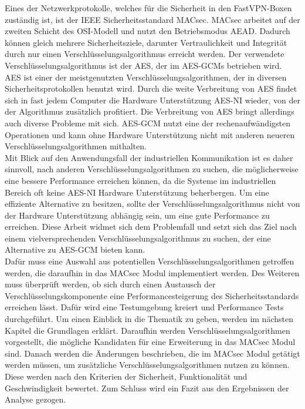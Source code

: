 Eines der Netzwerkprotokolle, welches für die Sicherheit in den FastVPN-Boxen zuständig ist, ist der \gls{IEEE} Sicherheitsstandard \gls{MACsec}. \gls{MACsec} arbeitet auf der zweiten Schicht des \gls{OSI-Modell} und nutzt den  Betriebsmodus \gls{AEAD}. Dadurch können gleich mehrere Sicherheitsziele, darunter Vertraulichkeit und Integrität durch nur einen Verschlüsselungsalgorithmus erreicht werden. Der verwendete Verschlüsselungsalgorithmus ist der \gls{AES}, der im  \glspl{AES-GCM} betrieben wird. \gls{AES} ist einer der meistgenutzten Verschlüsselungsalgorithmen, der in diversen Sicherheitsprotokollen benutzt wird. Durch die weite Verbreitung von \gls{AES} findet sich in fast jedem Computer die Hardware Unterstützung \gls{AES-NI} wieder, von der der Algorithmus zusätzlich profitiert. Die Verbreitung von \gls{AES} bringt allerdings auch diverse Probleme mit sich. \gls{AES-GCM} nutzt eine der rechenaufwändigsten Operationen und kann ohne Hardware Unterstützung nicht mit anderen neueren Verschlüsselungsalgorithmen mithalten.\\  
Mit Blick auf den Anwendungsfall der industriellen Kommunikation ist es daher sinnvoll, nach anderen Verschlüsselungsalgorithmen zu suchen, die möglicherweise eine bessere Performance erreichen können, da die Systeme im industriellen Bereich oft keine \gls{AES-NI} Hardware Unterstützung beherbergen. Um eine effiziente Alternative zu besitzen, sollte der Verschlüsselungsalgorithmus nicht von der Hardware Unterstützung abhängig sein, um eine gute Performance zu erreichen. 
Diese Arbeit widmet sich dem Problemfall und setzt sich das Ziel nach einem vielversprechenden Verschlüsselungsalgorithmus zu suchen, der eine Alternative zu \gls{AES-GCM} bieten kann. \\
Dafür muss eine Auswahl aus potentiellen Verschlüsselungsalgorithmen getroffen werden, die daraufhin in das \gls{MACsec} Modul implementiert werden. Des Weiteren muss überprüft werden, ob sich durch einen Austausch der Verschlüsselungskomponente eine Performancesteigerung des Sicherheitsstandards erreichen lässt. Dafür wird eine Testumgebung kreiert und Performance Tests durchgeführt.
Um einen Einblick in die Thematik zu geben, werden im nächsten Kapitel die Grundlagen erklärt. Daraufhin werden Verschlüsselungsalgorithmen vorgestellt, die mögliche Kandidaten für eine Erweiterung in das MACsec Modul sind. Danach werden die Änderungen beschrieben, die im MACsec Modul getätigt werden müssen, um zusätzliche Verschlüsselungsalgorithmen nutzen zu können. Diese werden nach den Kriterien der Sicherheit, Funktionalität und Geschwindigkeit bewertet. Zum Schluss wird ein Fazit aus den Ergebnissen der Analyse gezogen.




